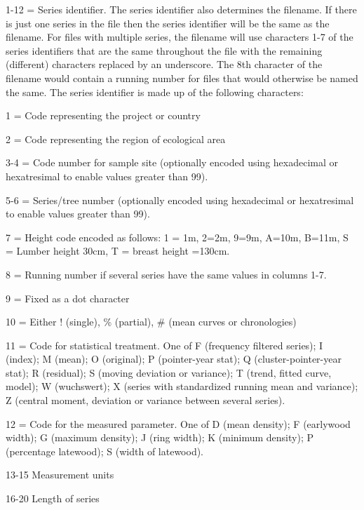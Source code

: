\documentclass[10pt, headsepline,DIV14,BCOR0.5cm]{scrreprt}
\begin{document}
\begin{itemize*}
 \item 1-12 = Series identifier. The series identifier also determines the filename. If there is just one series in the file then the series identifier will be the same as the filename. For files with multiple series, the filename will use characters 1-7 of the series identifiers that are the same throughout the file with the remaining (different) characters replaced by an underscore. The 8th character of the filename would contain a running number for files that would otherwise be named the same. The series identifier is made up of the following characters: 
  \begin{itemize*}
  \item 1 = Code representing the project or country
  \item  2 = Code representing the region of ecological area
  \item  3-4 = Code number for sample site (optionally encoded using hexadecimal or hexatresimal to enable values greater than 99).
  \item  5-6 = Series/tree number (optionally encoded using hexadecimal or hexatresimal to enable values greater than 99).
  \item  7 = Height code encoded as follows: 1 = 1m, 2=2m, 9=9m, A=10m, B=11m, S = Lumber height 30cm, T = breast height =130cm.
  \item  8 = Running number if several series have the same values in columns 1-7.
  \item  9 = Fixed as a dot character
  \item  10 = Either ! (single), \% (partial), \# (mean curves or chronologies)
  \item  11 = Code for statistical treatment. One of F (frequency filtered series); I (index); M (mean); O (original); P (pointer-year stat); Q (cluster-pointer-year stat); R (residual); S (moving deviation or variance); T (trend, fitted curve, model); W (wuchswert); X (series with standardized running mean and variance); Z (central moment, deviation or variance between several series).
  \item  12 = Code for the measured parameter. One of D (mean density); F (earlywood width); G (maximum density); J (ring width); K (minimum density); P (percentage latewood); S (width of latewood). 
  \end{itemize*}
\item  13-15 Measurement units
\item  16-20 Length of series

\end{itemize*}
\end{document}
